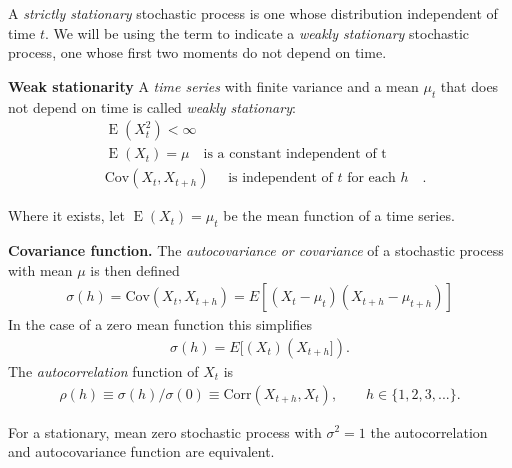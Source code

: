    A \textit{strictly stationary} 
   stochastic process is one 
   whose distribution independent of time $t$. 
   We will be using the term to indicate 
   a \textit{weakly stationary} stochastic process,
   one whose first two moments do not 
   depend on time.
  \begin{defn}\label{def:stationary}{\textbf{Weak stationarity} }
   A  \textit{time series} with finite variance and a 
  mean $\mu_t$ that does not depend on time is called 
   \textit{weakly stationary}: 
  \begin{align*}
    &\mathop{E}(X_t^2) < \infty \\
    &\mathop{E}(X_t)  = \mu \hspace{1em} \text{is a constant 
    independent of t }\hspace{1em} \\
    &\text{Cov}(X_t, X_{t+ h }) \hspace{1em}\text{ is independent
    of } t \text{ for each } h\hspace{1em}.
  \end{align*}   
  \end{defn}
   Where it exists, let $\mathop{E}(X_t)  = \mu_{t}$ be the mean function of a time series.
  \begin{defn}{\textbf{Covariance function.}} 
  \label{eq:auto_covariance}
  The  \textit{autocovariance or covariance} of a stochastic 
  process with mean $\mu$ 
  is then defined
  \begin{align*}
    \sigma(h) = \text{Cov}(X_{t}, X_{t + h})
                = E[(X_{t}-\mu_t)(X_{t + h} - \mu_{t + h})]  
   \end{align*}
   In the case of a zero mean function this simplifies
   \begin{align*}
      \sigma(h) = E[(X_{t})(X_{t + h}]).  
   \end{align*}
    The \textit{autocorrelation} function of $X_t$ is
    \begin{align*}
       \rho(h) \equiv \sigma(h)/\sigma(0) \equiv \text{Corr}(X_{t + h}, X_t), 
       \hspace{2em} h \in \{ 1,2,3,... \}.
     \end{align*} 
  \end{defn} 
  For a stationary, mean zero stochastic process with 
  $\sigma^2 = 1$ the autocorrelation and autocovariance function 
   are equivalent. 


